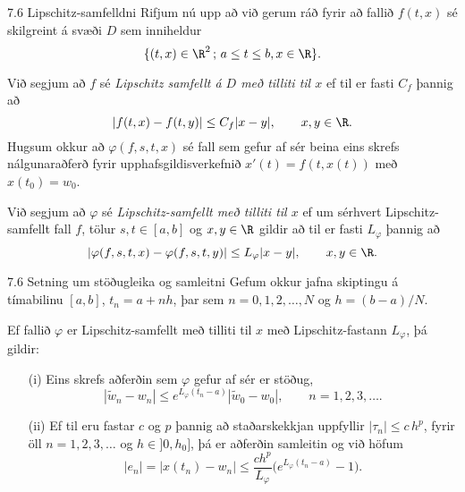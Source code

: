 \begin{frame}{7.6 Lipschitz-samfelldni} 
Rifjum nú upp að við gerum ráð fyrir að fallið $f(t,x)$ sé skilgreint
á svæði $D$ sem inniheldur 
$$
\{(t,x)\in \R^2 \, ;\, a\leq t\leq b, x\in \R\}.
$$

\pause
\smallskip
Við segjum að $f$ sé {\it Lipschitz samfellt á $D$ með tilliti til
  $x$} ef til er fasti $C_f$ þannig að 
$$
|f(t,x)-f(t,y)|\leq C_f|x-y|, \qquad x,y\in \R.
$$
Hugsum okkur að $\varphi(f,s,t,x)$ sé fall sem gefur af sér beina eins
skrefs nálgunaraðferð fyrir upphafsgildisverkefnið $x'(t)=f(t,x(t))$
með $x(t_0)=w_0$.  

\pause
\smallskip
Við segjum að $\varphi$ sé {\it Lipschitz-samfellt með
tilliti til $x$} ef um sérhvert Lipschitz-samfellt fall $f$, tölur
$s,t\in [a,b]$ og $x,y\in \R$ gildir að til er fasti $L_\varphi$
þannig að
$$
|\varphi(f,s,t,x)-\varphi(f,s,t,y)|\leq L_\varphi|x-y|, \qquad x,y\in \R.
$$ 
\end{frame}


\begin{frame}{7.6 Setning um stöðugleika og samleitni} 
Gefum okkur jafna skiptingu á tímabilinu $[a,b]$,
$t_n=a+nh$, þar sem $n=0,1,2,\dots,N$ og $h=(b-a)/N$.

\pause
\smallskip
Ef fallið $\varphi$ er Lipschitz-samfellt með tilliti til $x$ 
með Lipschitz-fastann
$L_\varphi$, þá gildir:
  \begin{enumerate}
  \item[(i)] Eins skrefs aðferðin sem $\varphi$ gefur af sér
er stöðug,
$$
|\tilde w_n-w_n|\leq e^{L_\varphi(t_n-a)}|\tilde w_0-w_0|, \qquad
n=1,2,3,\dots. 
$$
  \item[(ii)] Ef til eru fastar $c$ og $p$ þannig að staðarskekkjan
    uppfyllir $|\tau_n|\leq c\, h^p$, fyrir öll $n=1,2,3,\dots$ og
    $h\in ]0,h_0]$, þá er aðferðin samleitin og við höfum
$$
|e_n|=|x(t_n)-w_n|\leq \dfrac{ch^p}{L_\varphi}
\bigg(e^{L_\varphi(t_n-a)}-1\bigg).
$$ 
  \end{enumerate}
\end{frame}


